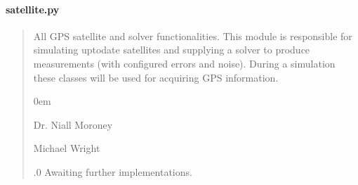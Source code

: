 \documentclass[letterpaper,10pt,english]{sphinxmanual}
\begin{document}
\paragraph{satellite.py}
\label{\detokenize{modules/gps/satellite:satellite-py}}\begin{quote}\begin{description}
\sphinxAtStartPar
All GPS satellite and solver functionalities.
This module is responsible for simulating up\sphinxhyphen{}to\sphinxhyphen{}date satellites and
supplying a solver to produce measurements (with configured errors
and noise). During a simulation these classes will be used for
acquiring GPS information.

\begin{DUlineblock}{0em}
\item[] Dr. Niall Moroney \sphinxhyphen{} 
\item[] Michael Wright \sphinxhyphen{} 
\end{DUlineblock}

.0 \sphinxhyphen{} Awaiting further implementations.

\end{description}\end{quote}
\end{document}
